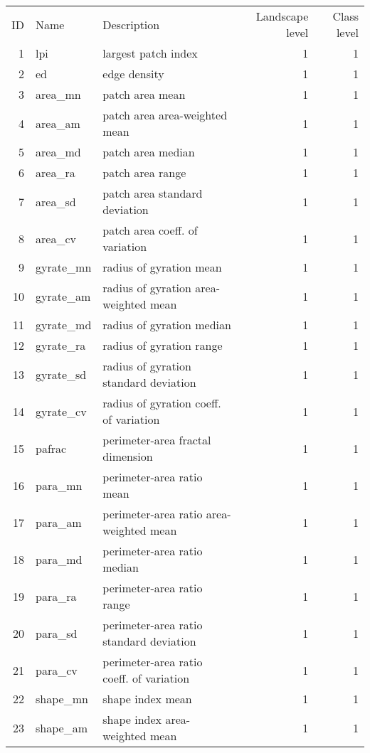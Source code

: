 \begin{longtable}{rllrr}
  \hline
ID & Name & Description & Landscape level & Class level \\ 
   1 & lpi & largest patch index &   1 &   1 \\ 
    2 & ed & edge density &   1 &   1 \\ 
    3 & area\_mn & patch area mean &   1 &   1 \\ 
    4 & area\_am & patch area area-weighted mean &   1 &   1 \\ 
    5 & area\_md & patch area median &   1 &   1 \\ 
    6 & area\_ra & patch area range &   1 &   1 \\ 
    7 & area\_sd & patch area standard deviation &   1 &   1 \\ 
    8 & area\_cv & patch area coeff. of variation &   1 &   1 \\ 
    9 & gyrate\_mn & radius of gyration mean &   1 &   1 \\ 
   10 & gyrate\_am & radius of gyration area-weighted mean &   1 &   1 \\ 
   11 & gyrate\_md & radius of gyration median &   1 &   1 \\ 
   12 & gyrate\_ra & radius of gyration range &   1 &   1 \\ 
   13 & gyrate\_sd & radius of gyration standard deviation &   1 &   1 \\ 
   14 & gyrate\_cv & radius of gyration coeff. of variation &   1 &   1 \\ 
   15 & pafrac & perimeter-area fractal dimension &   1 &   1 \\ 
   16 & para\_mn & perimeter-area ratio mean &   1 &   1 \\ 
   17 & para\_am & perimeter-area ratio area-weighted mean &   1 &   1 \\ 
   18 & para\_md & perimeter-area ratio median &   1 &   1 \\ 
   19 & para\_ra & perimeter-area ratio range &   1 &   1 \\ 
   20 & para\_sd & perimeter-area ratio standard deviation &   1 &   1 \\ 
   21 & para\_cv & perimeter-area ratio coeff. of variation &   1 &   1 \\ 
   22 & shape\_mn & shape index mean &   1 &   1 \\ 
   23 & shape\_am & shape index area-weighted mean &   1 &   1 \\ 

\end{longtable}
